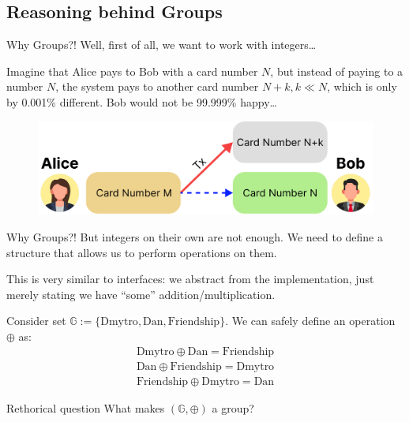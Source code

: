 \documentclass{beamer}
\begin{document}
    \subsection{Reasoning behind Groups}
    \begin{frame}{Why Groups?!}
        Well, first of all, we want to work with integers\ldots

        Imagine that Alice pays to Bob with a card number $N$, but instead of paying to a number $N$, the system pays 
        to another card number $N+k, k \ll N$, which is only by 0.001\% different. Bob would not be 99.999\% happy\ldots

        \begin{figure}
          \includegraphics[width=1.0\textwidth]{images/lecture_1/why_integers.pdf}
          \label{fig:why_integers}
        \end{figure}
    \end{frame}

    \begin{frame}{Why Groups?!}
        But integers on their own are not enough. We need to define a structure that allows us to perform operations on them.

        This is very similar to interfaces: we abstract from the implementation, just merely stating we have ``some'' addition/multiplication.

        \begin{example}
            Consider set $\mathbb{G} := \{\text{Dmytro}, \text{Dan}, \text{Friendship}\}$. We can safely define an operation $\oplus$ as:
            \begin{gather*}
                \text{Dmytro} \oplus \text{Dan} = \text{Friendship} \\ 
                \text{Dan} \oplus \text{Friendship} = \text{Dmytro} \\
                \text{Friendship} \oplus \text{Dmytro} = \text{Dan}
            \end{gather*}
        \end{example}

        \begin{block}{Rethorical question}
            What makes $(\mathbb{G}, \oplus)$ a group?
        \end{block}
    \end{frame}
\end{document}
